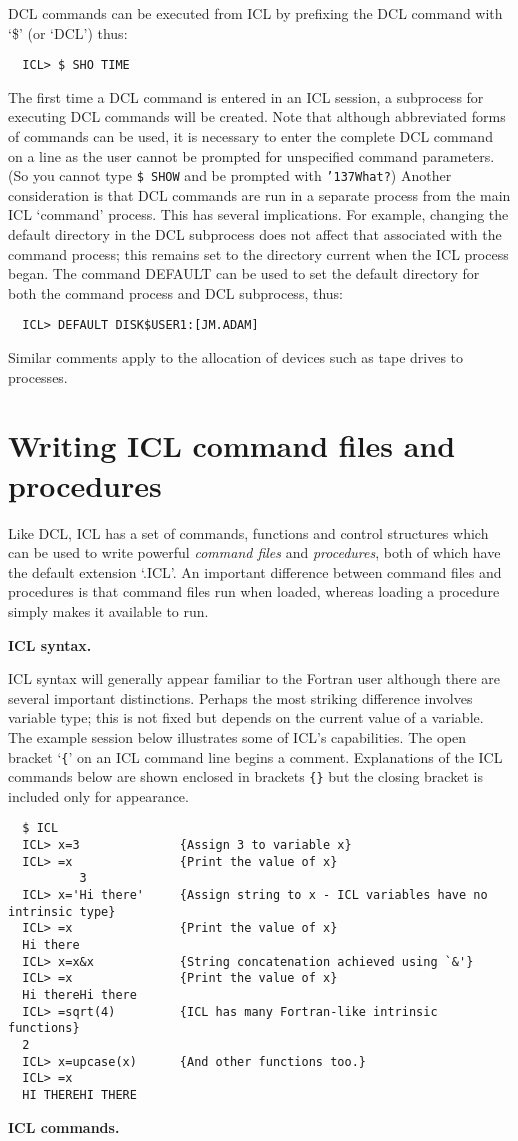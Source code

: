 \documentclass[twoside,11pt]{article}
\renewcommand{\_}{{\tt\char'137}}
\newcommand{\xlabel}[1]{}
\begin{document}
DCL  commands can be executed from ICL by prefixing the DCL command with
`\$' (or `DCL') thus:
\begin{verbatim}
  ICL> $ SHO TIME
\end{verbatim}
The first time a DCL command is entered in an ICL session, a subprocess
for executing DCL commands will be created. 
Note that although abbreviated forms of commands can be used, it is 
necessary to enter the complete DCL command on a line 
as the user  cannot be prompted for unspecified command parameters.
(So you cannot type {\tt \$ SHOW} and be prompted with {\tt \_What?})
Another consideration is that DCL commands are run in a separate 
process from the main ICL `command' process. This has several 
implications. For example, changing the default directory in the DCL 
subprocess does not affect that associated with the command process; this 
remains set to
the directory current when the ICL process began.
The command DEFAULT can be used to set the default directory for 
both the command process and DCL
subprocess, thus:
\begin{verbatim}
  ICL> DEFAULT DISK$USER1:[JM.ADAM]
\end{verbatim}
Similar comments apply to the allocation of devices such as tape drives
to processes.

\newpage
\section{Writing ICL command files and procedures\label{procs}\xlabel{writing_icl_command_files_and_procedures}}

Like DCL, ICL has a set of commands, functions and control structures which
can be used to write powerful {\sl command files\/} and {\sl procedures},
both of which have the default extension `.ICL'.
An important difference between command files and procedures
is that command files run when loaded, whereas loading a procedure
simply makes it available to run.


{\smallskip\large\bf ICL syntax.}

ICL syntax will generally appear familiar to the Fortran user although there 
are several important distinctions.
Perhaps the most striking difference involves variable type; this
is not fixed but depends on the current value of a variable. 
The example session below illustrates some of ICL's capabilities.
The open bracket `{\tt\{}' on an ICL command line  begins a comment.
Explanations of the ICL commands below are shown enclosed in brackets
{\tt \{\}}  but the closing bracket is included only for appearance.
\begin{verbatim}
  $ ICL
  ICL> x=3              {Assign 3 to variable x}
  ICL> =x               {Print the value of x}
          3
  ICL> x='Hi there'     {Assign string to x - ICL variables have no intrinsic type}
  ICL> =x               {Print the value of x}
  Hi there
  ICL> x=x&x            {String concatenation achieved using `&'}
  ICL> =x               {Print the value of x}
  Hi thereHi there
  ICL> =sqrt(4)         {ICL has many Fortran-like intrinsic functions}
  2
  ICL> x=upcase(x)      {And other functions too.}
  ICL> =x
  HI THEREHI THERE
\end{verbatim}
{\smallskip\large\bf ICL commands.}
\end{document}
